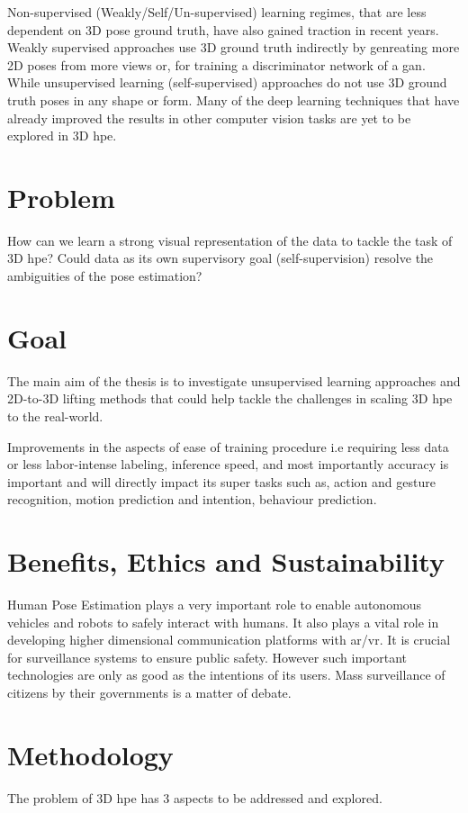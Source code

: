 Non-supervised (Weakly/Self/Un-supervised) learning regimes, that are less dependent on 3D pose ground truth, have also gained traction in recent years. Weakly supervised approaches use 3D ground truth indirectly by genreating more 2D poses from more views or, for training a discriminator network of a \ac{gan}. While unsupervised learning (self-supervised) approaches do not use 3D ground truth poses in any shape or form. Many of the deep learning techniques that have already improved the results in other computer vision tasks are yet to be explored in 3D \ac{hpe}. 

\section{Problem}
\label{sec:problem}
How can we learn a strong visual representation of the data to tackle the task of 3D \ac{hpe}? Could data as its own supervisory goal (self-supervision) resolve the ambiguities of the pose estimation?

\section{Goal}
\label{sec:goal}
The main aim of the thesis is to investigate unsupervised learning approaches and 2D-to-3D lifting methods that could help tackle the challenges in scaling 3D \ac{hpe} to the real-world.

Improvements in the aspects of ease of training procedure i.e requiring less data or less labor-intense labeling, inference speed, and most importantly accuracy is important and will directly impact its super tasks such as, action and gesture recognition, motion prediction and intention, behaviour prediction.

\section{Benefits, Ethics and Sustainability}
Human Pose Estimation plays a very important role to enable autonomous vehicles and robots to safely interact with humans. It also plays a vital role in developing higher dimensional communication platforms with \ac{ar/vr}. It is crucial for surveillance systems to ensure public safety. However such important technologies are only as good as the intentions of its users. Mass surveillance of citizens by their governments is a matter of debate.

\section{Methodology}
\label{sec:methodology}
The problem of 3D \ac{hpe} has 3 aspects to be addressed and explored.

